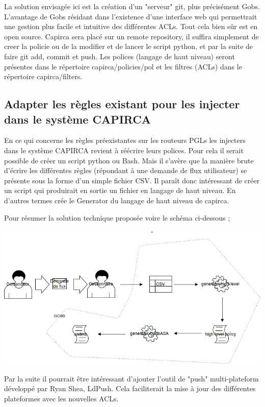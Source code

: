 \documentclass{article}
\begin{document}
La solution envisagée ici est la création d’un "serveur" git, plus précisément Gobs. L’avantage de Gobs résidant dans l’existence d’une interface web qui permettrait une gestion plus facile et intuitive des différentes ACLs. Tout cela bien sûr est en open source. Capirca sera placé sur un remote repository, il suffira simplement de creer la policie ou de la modifier et de lancer le script python, et par la suite de faire git add, commit et push. Les polices (langage de haut niveau) seront présentes dans le répertoire capirca/policies/pol et les filtres (ACLs) dans le répertoire capirca/filters. 

\maketitle
\subsection{Adapter les règles existant pour les injecter dans le système CAPIRCA}

En ce qui concerne les règles préexistantes sur les routeurs PGLs les injecters dans le système CAPIRCA revient à réécrire leurs polices. Pour cela il serait possible de créer un script python ou Bash. Mais il s’avère que la manière brute d’écrire les différentes règles (répondant à une demande de flux utilisateur) se présente sous la forme d’un simple fichier CSV. Il paraît donc intéressant de créer un script qui produirait en sortie un fichier en langage de haut niveau. En d’autres termes crée le Generator du langage de haut niveau de capirca.

Pour résumer la solution technique proposée voire le schéma ci-dessous ;

\centerline{\includegraphics[scale=0.4]{spec.png}}

Par la suite il pourrait être intéressant d'ajouter l'outil de "push" multi-plateform développé par Ryan Shea, LdPush. Cela faciliterait la mise à jour des différentes plateformes avec les nouvelles ACLs.
\end{document}
